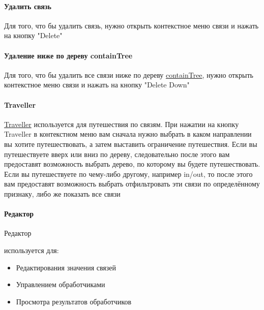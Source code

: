 \paragraph{Удалить связь}
Для того, что бы удалить связь, нужно открыть контекстное меню связи и нажать
на кнопку "Delete"
\paragraph{Удаление ниже по дереву
      containTree}\hypertarget{containTree.Deletion.Example}{}
Для того, что бы удалить все связи ниже по дереву
\hyperlink{containTree.Description}{containTree}, нужно открыть контекстное
меню связи
и нажать на кнопку "Delete Down"
\paragraph*{Traveller}
\hyperlink{Traveller.Description}{Traveller} используется для путешествия по
связям.
При нажатии на кнопку Traveller в контекстном меню вам сначала нужно выбрать в
каком направлении вы хотите путешествовать, а затем выставить ограничение
путешествия.
Если вы путешествуете вверх или вниз по дереву, следовательно после этого вам
предоставят возможность выбрать дерево, по которому вы будете путешествовать.
Если вы путешествуете по чему-либо другому, например in/out, то после этого вам
предоставят возможность выбрать отфильтровать эти связи по определённому
признаку, либо же показать все связи
\paragraph*{Редактор}
\hypertarget{Editor.Description}{Редактор} используется для:
\begin{itemize}
      \item Редактирования значения связей
      \item Управлением обработчиками
      \item Просмотра результатов обработчиков
\end{itemize}
